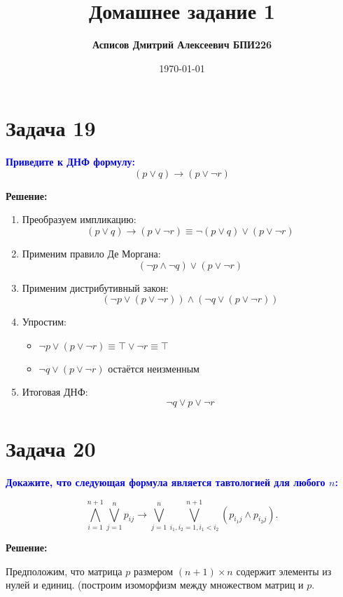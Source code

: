 \documentclass[12pt,a4paper]{article}
\title{\textbf{Домашнее задание 1}}
\author{\textbf{Асписов Дмитрий Алексеевич БПИ226}}
\date{\today}
\begin{document}
\maketitle


\section*{Задача 19}
\textcolor{blue}{\textbf{Приведите к ДНФ формулу:}}
\[
(p \vee q) \rightarrow (p \vee \neg r)
\]

\textbf{Решение:}

\begin{enumerate}[label=\arabic*., leftmargin=*]
\item Преобразуем импликацию:
   \[
   (p \vee q) \rightarrow (p \vee \neg r) 
   \equiv \neg (p \vee q) \vee (p \vee \neg r)
   \]

\item Применим правило Де Моргана:
   \[
   (\neg p \wedge \neg q) \vee (p \vee \neg r)
   \]

\item Применим дистрибутивный закон:
   \[
   (\neg p \vee (p \vee \neg r)) \wedge (\neg q \vee (p \vee \neg r))
   \]

\item Упростим:
   \begin{itemize}
   \item $\neg p \vee (p \vee \neg r) \equiv \top \vee \neg r \equiv \top$
   \item $\neg q \vee (p \vee \neg r)$ остаётся неизменным
   \end{itemize}

\item Итоговая ДНФ:
   \[
   \boxed{\neg q \vee p \vee \neg r}
   \]
\end{enumerate}


\section*{Задача 20}
\textcolor{blue}{\textbf{Докажите, что следующая формула является тавтологией для любого $n$:}}

\[
\bigwedge_{i=1}^{n+1} \bigvee_{j=1}^n p_{ij} \rightarrow \bigvee_{j=1}^n \bigvee_{i_1,i_2=1, i_1<i_2}^{n+1} (p_{i_1j} \wedge p_{i_2j}).
\]

\textbf{Решение:}

Предположим, что матрица \(p\) размером \((n+1) \times n\) содержит элементы из нулей и единиц. (построим изоморфизм между множеством матриц и $p$.
\end{document}
